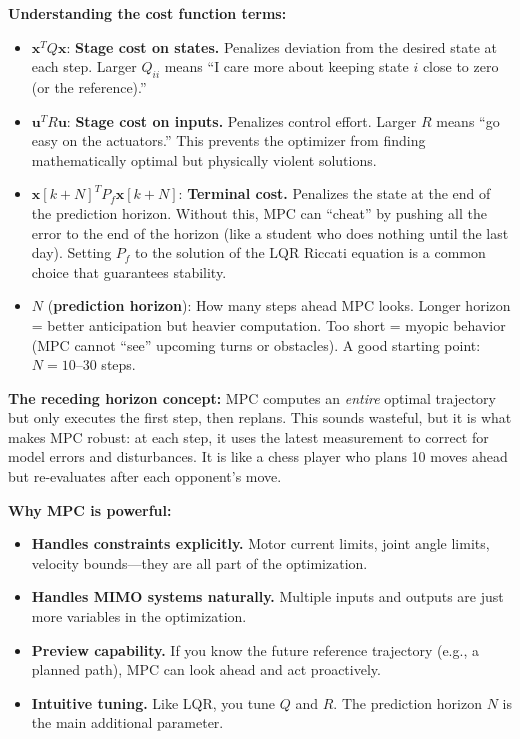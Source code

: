 \textbf{Understanding the cost function terms:}
\begin{itemize}
    \item $\mathbf{x}^T Q \mathbf{x}$: \textbf{Stage cost on states.} Penalizes deviation from the desired state at each step. Larger $Q_{ii}$ means ``I care more about keeping state $i$ close to zero (or the reference).''
    \item $\mathbf{u}^T R \mathbf{u}$: \textbf{Stage cost on inputs.} Penalizes control effort. Larger $R$ means ``go easy on the actuators.'' This prevents the optimizer from finding mathematically optimal but physically violent solutions.
    \item $\mathbf{x}[k+N]^T P_f \mathbf{x}[k+N]$: \textbf{Terminal cost.} Penalizes the state at the end of the prediction horizon. Without this, MPC can ``cheat'' by pushing all the error to the end of the horizon (like a student who does nothing until the last day). Setting $P_f$ to the solution of the LQR Riccati equation is a common choice that guarantees stability.
    \item $N$ (\textbf{prediction horizon}): How many steps ahead MPC looks. Longer horizon = better anticipation but heavier computation. Too short = myopic behavior (MPC cannot ``see'' upcoming turns or obstacles). A good starting point: $N = 10$--$30$ steps.
\end{itemize}

\textbf{The receding horizon concept:} MPC computes an \textit{entire} optimal trajectory but only executes the first step, then replans. This sounds wasteful, but it is what makes MPC robust: at each step, it uses the latest measurement to correct for model errors and disturbances. It is like a chess player who plans 10 moves ahead but re-evaluates after each opponent's move.

\textbf{Why MPC is powerful:}
\begin{itemize}
    \item \textbf{Handles constraints explicitly.} Motor current limits, joint angle limits, velocity bounds---they are all part of the optimization.
    \item \textbf{Handles MIMO systems naturally.} Multiple inputs and outputs are just more variables in the optimization.
    \item \textbf{Preview capability.} If you know the future reference trajectory (e.g., a planned path), MPC can look ahead and act proactively.
    \item \textbf{Intuitive tuning.} Like LQR, you tune $Q$ and $R$. The prediction horizon $N$ is the main additional parameter.
\end{itemize}

